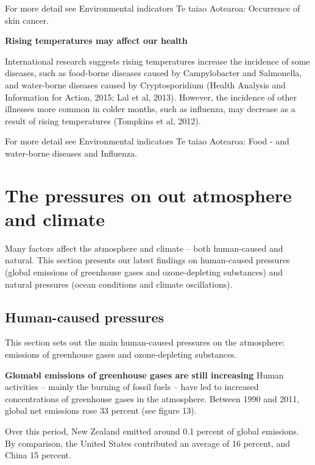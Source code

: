 \documentclass[11pt]{mfe-nzers} %
\begin{document}
For more detail see Environmental indicators Te taiao Aotearoa: Occurrence of skin cancer.

\textbf{Rising temperatures may affect our health}

International research suggests rising temperatures increase the incidence of some diseases, such as food-borne diseases caused by Campylobacter and Salmonella, and water-borne diseases caused by Cryptosporidium (Health Analysis and Information for Action, 2015; Lal et al, 2013). However, the incidence of other illnesses more common in colder months, such as influenza, may decrease as a result of rising temperatures (Tompkins et al, 2012).

For more detail see Environmental indicators Te taiao Aotearoa: Food - and water-borne diseases and Influenza.

\section{The pressures on out atmosphere and climate}

Many factors affect the atmosphere and climate – both human-caused and natural. This section presents our latest findings on human-caused pressures (global emissions of greenhouse gases and ozone-depleting substances) and natural pressures (ocean conditions and climate oscillations).

\subsection{Human-caused pressures}
This section sets out the main human-caused pressures on the atmosphere: emissions of greenhouse gases and ozone-depleting substances.

\textbf{Glomabl emissions of greenhouse gases are still increasing}
Human activities – mainly the burning of fossil fuels – have led to increased concentrations of greenhouse gases in the atmosphere. Between 1990 and 2011, global net emissions rose 33 percent (see figure 13).

Over this period, New Zealand emitted around 0.1 percent of global emissions. By comparison, the United States contributed an average of 16 percent, and China 15 percent.

\end{document}
